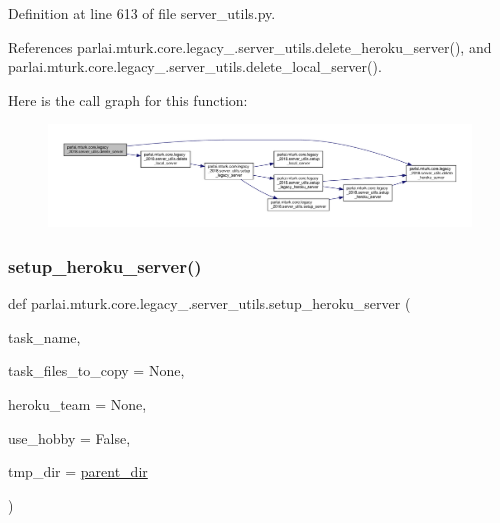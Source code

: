 Definition at line 613 of file server\+\_\+utils.\+py.



References parlai.\+mturk.\+core.\+legacy\+\_.\+server\+\_\+utils.\+delete\+\_\+heroku\+\_\+server(), and parlai.\+mturk.\+core.\+legacy\+\_.\+server\+\_\+utils.\+delete\+\_\+local\+\_\+server().

Here is the call graph for this function\+:
\nopagebreak
\begin{figure}[H]
\begin{center}
\leavevmode
\includegraphics[width=350pt]{namespaceparlai_1_1mturk_1_1core_1_1legacy__2018_1_1server__utils_a034c68a129a95ca47005fc7f81bdfc09_cgraph}
\end{center}
\end{figure}
\mbox{\label{namespaceparlai_1_1mturk_1_1core_1_1legacy__2018_1_1server__utils_afa5c0e9444c2d4f19817c07a5a193875}} 
\subsubsection{\texorpdfstring{setup\+\_\+heroku\+\_\+server()}{setup\_heroku\_server()}}
{\footnotesize\ttfamily def parlai.\+mturk.\+core.\+legacy\+\_.\+server\+\_\+utils.\+setup\+\_\+heroku\+\_\+server (\begin{DoxyParamCaption}\item[{}]{task\+\_\+name,  }\item[{}]{task\+\_\+files\+\_\+to\+\_\+copy = {\ttfamily None},  }\item[{}]{heroku\+\_\+team = {\ttfamily None},  }\item[{}]{use\+\_\+hobby = {\ttfamily False},  }\item[{}]{tmp\+\_\+dir = {\ttfamily \hyperlink{namespaceparlai_1_1mturk_1_1core_1_1legacy__2018_1_1server__utils_a6a871d2f8e5c0768a82ab8fa2e7fadae}{parent\+\_\+dir}} }\end{DoxyParamCaption})}



